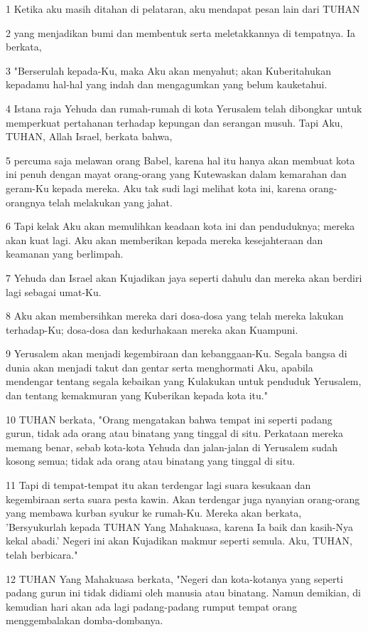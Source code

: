 \par 1 Ketika aku masih ditahan di pelataran, aku mendapat pesan lain dari TUHAN
\par 2 yang menjadikan bumi dan membentuk serta meletakkannya di tempatnya. Ia berkata,
\par 3 "Berserulah kepada-Ku, maka Aku akan menyahut; akan Kuberitahukan kepadamu hal-hal yang indah dan mengagumkan yang belum kauketahui.
\par 4 Istana raja Yehuda dan rumah-rumah di kota Yerusalem telah dibongkar untuk memperkuat pertahanan terhadap kepungan dan serangan musuh. Tapi Aku, TUHAN, Allah Israel, berkata bahwa,
\par 5 percuma saja melawan orang Babel, karena hal itu hanya akan membuat kota ini penuh dengan mayat orang-orang yang Kutewaskan dalam kemarahan dan geram-Ku kepada mereka. Aku tak sudi lagi melihat kota ini, karena orang-orangnya telah melakukan yang jahat.
\par 6 Tapi kelak Aku akan memulihkan keadaan kota ini dan penduduknya; mereka akan kuat lagi. Aku akan memberikan kepada mereka kesejahteraan dan keamanan yang berlimpah.
\par 7 Yehuda dan Israel akan Kujadikan jaya seperti dahulu dan mereka akan berdiri lagi sebagai umat-Ku.
\par 8 Aku akan membersihkan mereka dari dosa-dosa yang telah mereka lakukan terhadap-Ku; dosa-dosa dan kedurhakaan mereka akan Kuampuni.
\par 9 Yerusalem akan menjadi kegembiraan dan kebanggaan-Ku. Segala bangsa di dunia akan menjadi takut dan gentar serta menghormati Aku, apabila mendengar tentang segala kebaikan yang Kulakukan untuk penduduk Yerusalem, dan tentang kemakmuran yang Kuberikan kepada kota itu."
\par 10 TUHAN berkata, "Orang mengatakan bahwa tempat ini seperti padang gurun, tidak ada orang atau binatang yang tinggal di situ. Perkataan mereka memang benar, sebab kota-kota Yehuda dan jalan-jalan di Yerusalem sudah kosong semua; tidak ada orang atau binatang yang tinggal di situ.
\par 11 Tapi di tempat-tempat itu akan terdengar lagi suara kesukaan dan kegembiraan serta suara pesta kawin. Akan terdengar juga nyanyian orang-orang yang membawa kurban syukur ke rumah-Ku. Mereka akan berkata, 'Bersyukurlah kepada TUHAN Yang Mahakuasa, karena Ia baik dan kasih-Nya kekal abadi.' Negeri ini akan Kujadikan makmur seperti semula. Aku, TUHAN, telah berbicara."
\par 12 TUHAN Yang Mahakuasa berkata, "Negeri dan kota-kotanya yang seperti padang gurun ini tidak didiami oleh manusia atau binatang. Namun demikian, di kemudian hari akan ada lagi padang-padang rumput tempat orang menggembalakan domba-dombanya.
